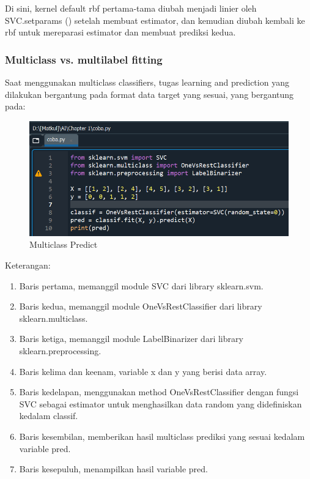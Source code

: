 \par Di sini, kernel default rbf pertama-tama diubah menjadi linier oleh SVC.setparams () setelah membuat estimator, dan kemudian diubah kembali ke rbf untuk mereparasi estimator dan membuat prediksi kedua.

\subsubsection{Multiclass vs. multilabel fitting}

\par Saat menggunakan multiclass classifiers, tugas learning and prediction yang dilakukan bergantung pada format data target yang sesuai, yang bergantung pada:

    \begin{figure}[H]
    \centering
    \includegraphics[width=13cm]{figures/chapter1/26.PNG}
    \caption{Multiclass Predict}
    \end{figure}

\par Keterangan:
    \begin{enumerate}
        \item Baris pertama, memanggil module SVC dari library sklearn.svm.
        \item Baris kedua, memanggil module OneVsRestClassifier dari library sklearn.multiclass.
        \item Baris ketiga, memanggil module LabelBinarizer dari library sklearn.preprocessing.
        \item Baris kelima dan keenam, variable x dan y yang berisi data array.
        \item Baris kedelapan, menggunakan method OneVsRestClassifier dengan fungsi SVC sebagai estimator untuk menghasilkan data random yang didefiniskan kedalam classif.
        \item Baris kesembilan, memberikan hasil multiclass prediksi yang sesuai kedalam variable pred.
        \item Baris kesepuluh, menampilkan hasil variable pred.
    \end{enumerate}

